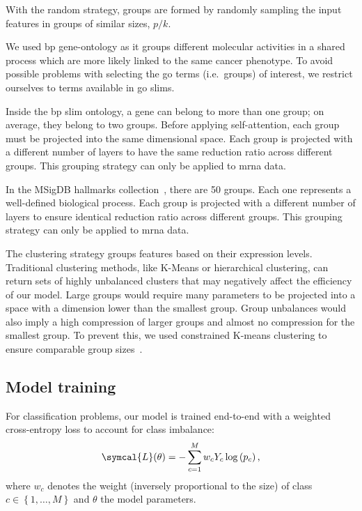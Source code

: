 \documentclass[../main.tex]{subfiles}
\begin{document}
		\begin{description}[
				style=multiline,
				leftmargin=!,
				labelwidth=2.2cm
			]
			\item[Random]
				With the random strategy, groups are formed by randomly sampling the input features in groups of similar sizes, \(p/k\).
			\item[Gene Ontology]
				We used \gls{bp} gene-ontology as it groups different molecular activities in a shared process which are more likely linked to the same cancer phenotype.
				To avoid possible problems with selecting the \gls{go} terms (i.e.\ groups) of interest, we restrict ourselves to terms available in \gls{go} slims.

				Inside the \gls{bp} slim ontology, a gene can belong to more than one group; on average, they belong to two groups.
				Before applying self-attention, each group must be projected into the same dimensional space.
				Each group is projected with a different number of layers to have the same reduction ratio across different groups. This grouping strategy can only be applied to \gls{mrna} data.
			\item[Hallmarks]
				In the MSigDB hallmarks collection~\cite{Liberzon2015}, there are 50 groups.
				Each one represents a well-defined biological process.
				Each group is projected with a different number of layers to ensure identical reduction ratio across different groups. This grouping strategy can only be applied to \gls{mrna} data.
			\item[Clustering]
				The clustering strategy groups features based on their expression levels.
				Traditional clustering methods, like K-Means or hierarchical clustering, can return sets of highly unbalanced clusters that may negatively affect the efficiency of our model.
				Large groups would require many parameters to be projected into a space with a dimension lower than the smallest group.
				Group unbalances would also imply a high compression of larger groups and almost no compression for the smallest group.
				To prevent this, we used constrained K-means clustering to ensure comparable group sizes~\cite{bradleyConstrainedKMeansClustering}.
		\end{description}


	\subsection{Model training}

		For classification problems, our model is trained end-to-end with a weighted cross-entropy loss to account for class imbalance:
		\[ \symcal{L}(\theta) = - \sum_{c=1}^{M}w_c Y_c \log\left( p_c\right) \text{,}\]
		where \(w_c\) denotes the weight (inversely proportional to the size) of class \(c \in \left\{1, \ldots,M \right\}\) and \(\theta\) the model parameters.
\end{document}
